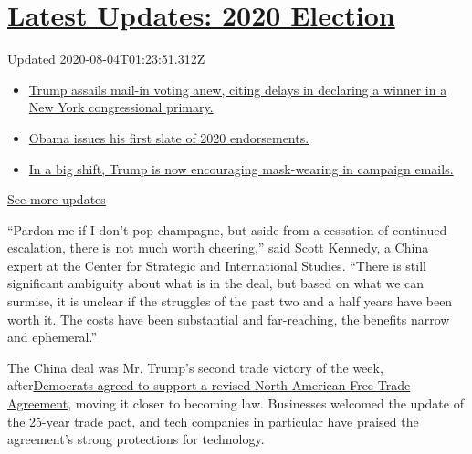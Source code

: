 \hypertarget{latest-updates-2020-election}{%
\section{\texorpdfstring{\href{https://www.nytimes.com/2020/08/03/us/elections/biden-vs-trump.html?action=click\&pgtype=Article\&state=default\&region=MAIN_CONTENT_1\&context=storylines_live_updates}{Latest
Updates: 2020
Election}}{Latest Updates: 2020 Election}}\label{latest-updates-2020-election}}

Updated 2020-08-04T01:23:51.312Z

\begin{itemize}
\tightlist
\item
  \href{https://www.nytimes.com/2020/08/03/us/elections/biden-vs-trump.html?action=click\&pgtype=Article\&state=default\&region=MAIN_CONTENT_1\&context=storylines_live_updates\#link-6494b448}{Trump
  assails mail-in voting anew, citing delays in declaring a winner in a
  New York congressional primary.}
\item
  \href{https://www.nytimes.com/2020/08/03/us/elections/biden-vs-trump.html?action=click\&pgtype=Article\&state=default\&region=MAIN_CONTENT_1\&context=storylines_live_updates\#link-3de249e6}{Obama
  issues his first slate of 2020 endorsements.}
\item
  \href{https://www.nytimes.com/2020/08/03/us/elections/biden-vs-trump.html?action=click\&pgtype=Article\&state=default\&region=MAIN_CONTENT_1\&context=storylines_live_updates\#link-54e34d20}{In
  a big shift, Trump is now encouraging mask-wearing in campaign
  emails.}
\end{itemize}

\href{https://www.nytimes.com/2020/08/03/us/elections/biden-vs-trump.html?action=click\&pgtype=Article\&state=default\&region=MAIN_CONTENT_1\&context=storylines_live_updates}{See
more updates}

``Pardon me if I don't pop champagne, but aside from a cessation of
continued escalation, there is not much worth cheering,'' said Scott
Kennedy, a China expert at the Center for Strategic and International
Studies. ``There is still significant ambiguity about what is in the
deal, but based on what we can surmise, it is unclear if the struggles
of the past two and a half years have been worth it. The costs have been
substantial and far-reaching, the benefits narrow and ephemeral.''

The China deal was Mr. Trump's second trade victory of the week,
after\href{https://www.nytimes.com/2019/12/10/us/politics/usmca-trade-deal.html}{Democrats
agreed to support a revised North American Free Trade Agreement}, moving
it closer to becoming law. Businesses welcomed the update of the 25-year
trade pact, and tech companies in particular have praised the
agreement's strong protections for technology.

